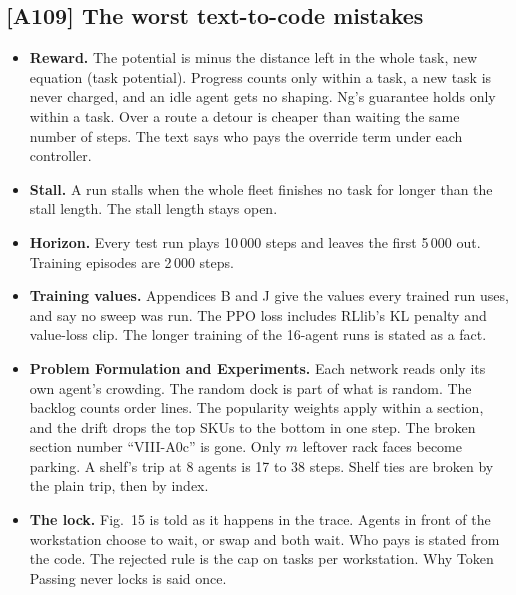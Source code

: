 \documentclass[11pt,a4paper]{article}
\begin{document}
\subsection*{[A109] The worst text-to-code mistakes}
\begin{itemize}
  \item \textbf{Reward.} The potential is minus the distance left in the whole
        task, new equation (task potential). Progress counts only within a
        task, a new task is never charged, and an idle agent gets no shaping.
        Ng's guarantee holds only within a task. Over a route a detour is
        cheaper than waiting the same number of steps. The text says who pays
        the override term under each controller.
  \item \textbf{Stall.} A run stalls when the whole fleet finishes no task for
        longer than the stall length. The stall length stays open.
  \item \textbf{Horizon.} Every test run plays 10\,000 steps and leaves the first
        5\,000 out. Training episodes are 2\,000 steps.
  \item \textbf{Training values.} Appendices B and J give the values every
        trained run uses, and say no sweep was run. The PPO loss includes
        RLlib's KL penalty and value-loss clip. The longer training of the
        16-agent runs is stated as a fact.
  \item \textbf{Problem Formulation and Experiments.} Each network reads only its
        own agent's crowding. The random dock is part of what is random. The
        backlog counts order lines. The popularity weights apply within a
        section, and the drift drops the top SKUs to the bottom in one step.
        The broken section number ``VIII-A0c'' is gone. Only $m$ leftover
        rack faces become parking. A shelf's trip at 8 agents is 17 to 38
        steps. Shelf ties are broken by the plain trip, then by index.
  \item \textbf{The lock.} Fig.~15 is told as it happens in the trace. Agents in
        front of the workstation choose to wait, or swap and both wait. Who
        pays is stated from the code. The rejected rule is the cap on tasks
        per workstation. Why Token Passing never locks is said once.
\end{itemize}
\end{document}
